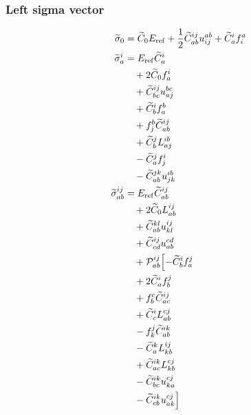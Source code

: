 \subsubsection{Left sigma vector}
\begin{align*}
\widetilde{\sigma}_{0} &= \widetilde{C}_{0} E_{\mathrm{ref}}   + \frac{1}{2} \widetilde{C}^{ij}_{ab}  u^{ab}_{ij}   + \widetilde{C}^{i}_{a}  f^{a}_{i} \\
\widetilde{\sigma}^{i}_{a} &= E_{\mathrm{ref}} \widetilde{C}^{i}_{a}  \\
  &\quad  + 2 \widetilde{C}_{0} f^{i}_{a}  \\
  &\quad  + \widetilde{C}^{ij}_{bc}  u^{bc}_{aj}  \\
  &\quad  + \widetilde{C}^{i}_{b}  f^{b}_{a}  \\
  &\quad  + f^{b}_{j}  \widetilde{C}^{ij}_{ab}  \\
  &\quad  + \widetilde{C}^{j}_{b}  L^{ib}_{aj}  \\
  &\quad - \widetilde{C}^{j}_{a}  f^{i}_{j}  \\
  &\quad - \widetilde{C}^{jk}_{ab}  u^{ib}_{jk} \\
\widetilde{\sigma}^{ij}_{ab} &= E_{\mathrm{ref}} \widetilde{C}^{ij}_{ab}  \\
  &\quad  + 2 \widetilde{C}_{0} L^{ij}_{ab}  \\
  &\quad  + \widetilde{C}^{kl}_{ab}  u^{ij}_{kl}  \\
  &\quad  + \widetilde{C}^{ij}_{cd}  u^{cd}_{ab} \\
  &\quad + \mathcal{P}^{ij}_{ab}\Bigl[ - \widetilde{C}^{i}_{b}  f^{j}_{a}  \\
  &\quad  + 2 \widetilde{C}^{i}_{a}  f^{j}_{b}  \\
  &\quad  + f^{c}_{b}  \widetilde{C}^{ij}_{ac}  \\
  &\quad  + \widetilde{C}^{i}_{c}  L^{cj}_{ab}  \\
  &\quad - f^{j}_{k}  \widetilde{C}^{ik}_{ab}  \\
  &\quad - \widetilde{C}^{k}_{a}  L^{ij}_{kb}  \\
  &\quad  + \widetilde{C}^{ik}_{ac}  L^{cj}_{kb}  \\
  &\quad - \widetilde{C}^{ik}_{bc}  u^{cj}_{ka}  \\
  &\quad - \widetilde{C}^{ik}_{cb}  u^{cj}_{ak} \Bigr]
\end{align*}


